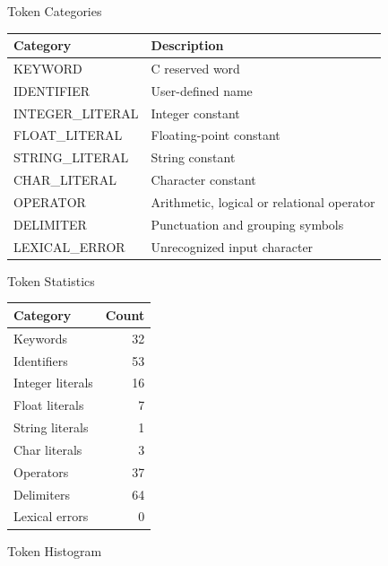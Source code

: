 \documentclass[aspectratio=169]{beamer}
\begin{document}
\begin{frame}{Token Categories}
\small
\begin{table}
\centering
\begin{tabular}{ll}
\textbf{Category} & \textbf{Description} \\
\hline
KEYWORD & C reserved word \\
IDENTIFIER & User-defined name \\
INTEGER\_LITERAL & Integer constant \\
FLOAT\_LITERAL & Floating-point constant \\
STRING\_LITERAL & String constant \\
CHAR\_LITERAL & Character constant \\
OPERATOR & Arithmetic, logical or relational operator \\
DELIMITER & Punctuation and grouping symbols \\
LEXICAL\_ERROR & Unrecognized input character \\
\end{tabular}
\end{table}
\end{frame}

\begin{frame}{Token Statistics}
\begin{center}
\begin{tabular}{lr}
\textbf{Category} & \textbf{Count} \\
\hline
Keywords & 32 \\
Identifiers & 53 \\
Integer literals & 16 \\
Float literals & 7 \\
String literals & 1 \\
Char literals & 3 \\
Operators & 37 \\
Delimiters & 64 \\
Lexical errors & 0 \\
\end{tabular}
\end{center}
\end{frame}

\begin{frame}{Token Histogram}
\centering
{}
\end{frame}
\end{document}
